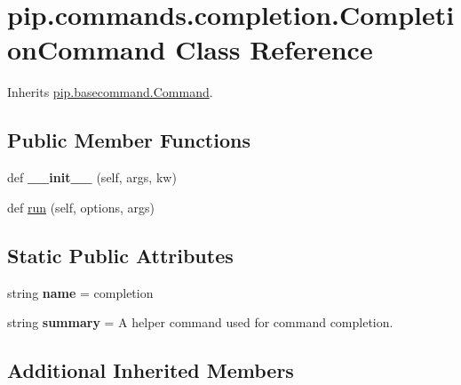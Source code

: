 \hypertarget{classpip_1_1commands_1_1completion_1_1_completion_command}{}\section{pip.\+commands.\+completion.\+Completion\+Command Class Reference}
\label{classpip_1_1commands_1_1completion_1_1_completion_command}


Inherits \hyperlink{classpip_1_1basecommand_1_1_command}{pip.\+basecommand.\+Command}.

\subsection*{Public Member Functions}
\begin{DoxyCompactItemize}
\item 
\mbox{\label{classpip_1_1commands_1_1completion_1_1_completion_command_ae0e4bd966e9442c6e901829e6bee602b}} 
def {\bfseries \+\_\+\+\_\+init\+\_\+\+\_\+} (self, args, kw)
\item 
def \hyperlink{classpip_1_1commands_1_1completion_1_1_completion_command_ad190206296de237e2e75dba8b8efacd1}{run} (self, options, args)
\end{DoxyCompactItemize}
\subsection*{Static Public Attributes}
\begin{DoxyCompactItemize}
\item 
\mbox{\label{classpip_1_1commands_1_1completion_1_1_completion_command_ac503272831456c362b5629408f338e60}} 
string {\bfseries name} = \textquotesingle{}completion\textquotesingle{}
\item 
\mbox{\label{classpip_1_1commands_1_1completion_1_1_completion_command_ad81a470f081b289fc4d8ec444da8043d}} 
string {\bfseries summary} = \textquotesingle{}A helper command used for command completion.\textquotesingle{}
\end{DoxyCompactItemize}
\subsection*{Additional Inherited Members}


